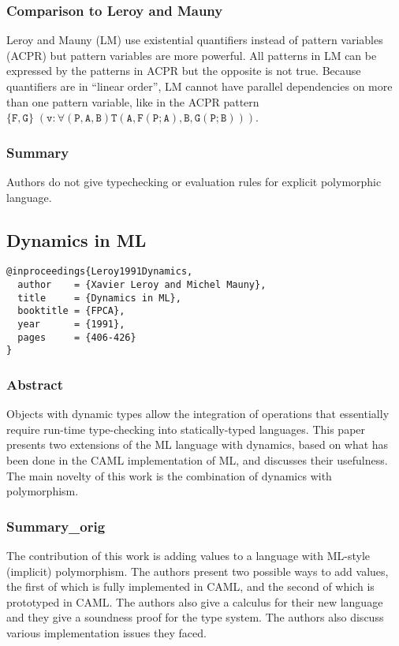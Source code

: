 \documentclass[12pt]{article}	%
\begin{document}
\subsubsection*{Comparison to Leroy and Mauny~\cite{Leroy1991Dynamics}}
Leroy and Mauny (LM) use existential quantifiers instead of pattern variables (ACPR) but pattern variables are more powerful. All patterns in LM can be expressed by the patterns in ACPR but the opposite is not true. Because quantifiers are in ``linear order'', LM cannot have parallel dependencies on more than one pattern variable, like in the ACPR pattern $\mathtt{\{F,G\} \; (v:\forall (P,A,B)T(A,F(P;A),B,G(P;B)))}$.

\subsubsection*{Summary}
Authors do not give typechecking or evaluation rules for explicit polymorphic language.


\subsection*{Dynamics in ML~\cite{Leroy1991Dynamics}}
\begin{verbatim}
@inproceedings{Leroy1991Dynamics,
  author    = {Xavier Leroy and Michel Mauny},
  title     = {Dynamics in ML},
  booktitle = {FPCA},
  year      = {1991},
  pages     = {406-426}
}
\end{verbatim}

\newcommand{\mlcode}[1]{$\mathtt{#1}$}

\subsubsection*{Abstract}
Objects with dynamic types allow the integration of operations that essentially require run-time type-checking into statically-typed languages. This paper presents two extensions of the ML language with dynamics, based on what has been done in the CAML implementation of ML, and discusses their usefulness. The main novelty of this work is the combination of dynamics with polymorphism.

\subsubsection*{Summary\_orig}
The contribution of this work is adding \Dynamic values to a language with ML-style (implicit) polymorphism. The authors present two possible ways to add \Dynamic values, the first of which is fully implemented in CAML, and the second of which is prototyped in CAML. The authors also give a calculus for their new language and they give a soundness proof for the type system. The authors also discuss various implementation issues they faced.
\end{document}
